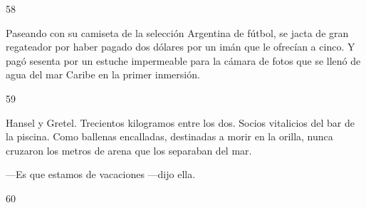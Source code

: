 \documentclass[12pt,twoside,openright,a5paper]{book}
\begin{document}
\hrulefill \hspace{0.1cm}\decofourleft\hspace{0.2cm} 58 \hspace{0.2cm}\decofourright \hspace{0.1cm}\hrulefill

\nopagebreak

\vspace{0.5cm}

\nopagebreak

Paseando con su camiseta de la selección Argentina de fútbol, se jacta de
gran regateador por haber pagado dos dólares por un imán que le ofrecían
a cinco. Y pagó sesenta por un estuche impermeable para la cámara de fotos
que se llenó de agua del mar Caribe en la primer inmersión.

\vspace{0.5cm}

\hrulefill \hspace{0.1cm}\decofourleft\hspace{0.2cm} 59 \hspace{0.2cm}\decofourright \hspace{0.1cm}\hrulefill

\nopagebreak

\vspace{0.5cm}

\nopagebreak

Hansel y Gretel. Trecientos kilogramos entre los dos. Socios vitalicios del bar de la
piscina. Como ballenas encalladas, destinadas a morir en la orilla, nunca
cruzaron los metros de arena que los separaban del mar.

---Es que estamos de vacaciones ---dijo ella.

\vspace{0.5cm}

\hrulefill \hspace{0.1cm}\decofourleft\hspace{0.2cm} 60 \hspace{0.2cm}\decofourright \hspace{0.1cm}\hrulefill

\nopagebreak

\vspace{0.5cm}

\nopagebreak
\end{document}
